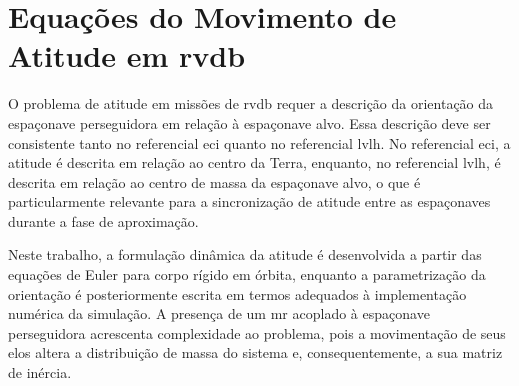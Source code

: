 
\section{Equações do Movimento de Atitude em \gls{rvdb}}
\label{sec:equacoes_movimento_atitude}

O problema de atitude em missões de \gls{rvdb} requer a descrição da orientação da espaçonave perseguidora em relação à espaçonave alvo. Essa descrição deve ser consistente tanto no referencial \gls{eci} quanto no referencial \gls{lvlh}. No referencial \gls{eci}, a atitude é descrita em relação ao centro da Terra, enquanto, no referencial \gls{lvlh}, é descrita em relação ao centro de massa da espaçonave alvo, o que é particularmente relevante para a sincronização de atitude entre as espaçonaves durante a fase de aproximação.

Neste trabalho, a formulação dinâmica da atitude é desenvolvida a partir das equações de Euler para corpo rígido em órbita, enquanto a parametrização da orientação é posteriormente escrita em termos adequados à implementação numérica da simulação. A presença de um \gls{mr} acoplado à espaçonave perseguidora acrescenta complexidade ao problema, pois a movimentação de seus elos altera a distribuição de massa do sistema e, consequentemente, a sua matriz de inércia.




